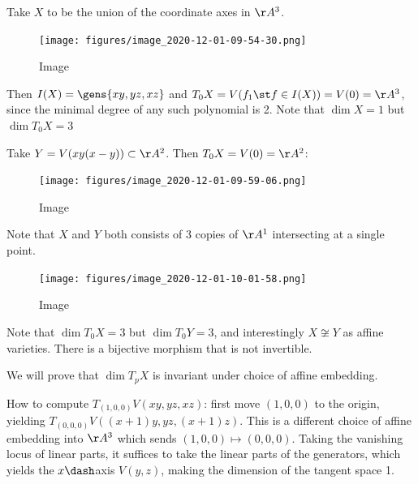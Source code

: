 \begin{example}[?]

Take \(X\) to be the union of the coordinate axes in \(\AA^3\).

\begin{figure}
\centering
\texttt{[image: figures/image\_2020-12-01-09-54-30.png]}
\caption{Image}
\end{figure}

Then \(I(X) = \gens{xy, yz, xz}\) and
\(T_0 X = V(f_1 \st f\in I(X)) = V(0) = \AA^3\), since the minimal
degree of any such polynomial is 2. Note that \(\dim X = 1\) but
\(\dim T_0 X = 3\)

\end{example}

\begin{example}[?]

Take \(Y = V(xy(x-y)) \subset \AA^2\). Then \(T_0 X = V(0) = \AA^2\):

\begin{figure}
\centering
\texttt{[image: figures/image\_2020-12-01-09-59-06.png]}
\caption{Image}
\end{figure}

\end{example}

\begin{remark}

Note that \(X\) and \(Y\) both consists of 3 copies of \(\AA^1\)
intersecting at a single point.

\begin{figure}
\centering
\texttt{[image: figures/image\_2020-12-01-10-01-58.png]}
\caption{Image}
\end{figure}

Note that \(\dim T_0 X = 3\) but \(\dim T_0 Y = 3\), and interestingly
\(X\not\cong Y\) as affine varieties. There is a bijective morphism that
is not invertible.

\end{remark}

\begin{remark}

We will prove that \(\dim T_p X\) is invariant under choice of affine
embedding.

\end{remark}

\begin{example}[?]

How to compute \(T_{(1,0,0)} V(xy, yz, xz)\): first move \((1,0,0)\) to
the origin, yielding \(T_{(0,0,0)} V((x+1)y, yz, (x+1) z)\). This is a
different choice of affine embedding into \(\AA^3\) which sends
\((1,0,0) \mapsto (0,0,0)\). Taking the vanishing locus of linear parts,
it suffices to take the linear parts of the generators, which yields the
\(x\dash\)axis \(V(y, z)\), making the dimension of the tangent space 1.

\end{example}

